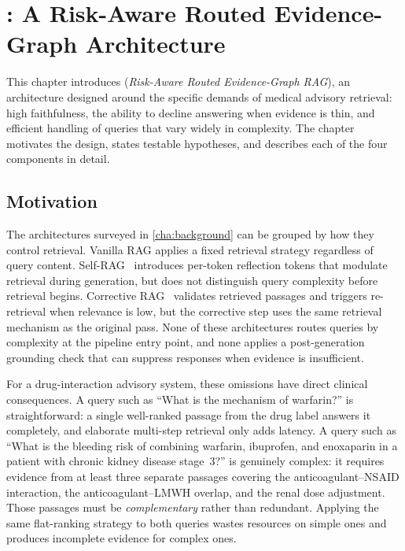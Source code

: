 \chapter{\rarerag{}: A Risk-Aware Routed Evidence-Graph Architecture}
\label{cha:rare_rag}

This chapter introduces \rarerag{} (\textit{Risk-Aware Routed Evidence-Graph RAG}),
an architecture designed around the specific demands of medical advisory retrieval:
high faithfulness, the ability to decline answering when evidence is thin,
and efficient handling of queries that vary widely in complexity.
The chapter motivates the design, states testable hypotheses,
and describes each of the four components in detail.

\section{Motivation}
\label{sec:rarerag_motivation}

The architectures surveyed in \cref{cha:background} can be grouped by
how they control retrieval.
Vanilla RAG applies a fixed retrieval strategy regardless of query content.
Self-RAG~\cite{asai2024selfrag} introduces per-token reflection tokens that
modulate retrieval during generation, but does not distinguish query complexity
before retrieval begins.
Corrective RAG~\cite{yan2024crag} validates retrieved passages and triggers
re-retrieval when relevance is low, but the corrective step uses the same
retrieval mechanism as the original pass.
None of these architectures routes queries by complexity at the pipeline entry
point, and none applies a post-generation grounding check that can suppress
responses when evidence is insufficient.

For a drug-interaction advisory system, these omissions have direct clinical
consequences.
A query such as ``What is the mechanism of warfarin?'' is straightforward:
a single well-ranked passage from the drug label answers it completely,
and elaborate multi-step retrieval only adds latency.
A query such as ``What is the bleeding risk of combining warfarin, ibuprofen,
and enoxaparin in a patient with chronic kidney disease stage~3?'' is genuinely
complex: it requires evidence from at least three separate passages covering
the anticoagulant--NSAID interaction, the anticoagulant--LMWH overlap, and the
renal dose adjustment.
Those passages must be \emph{complementary} rather than redundant.
Applying the same flat-ranking strategy to both queries wastes resources on
simple ones and produces incomplete evidence for complex ones.

